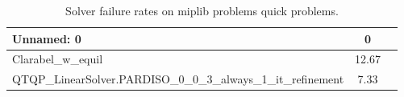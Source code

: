 \begin{table}
\caption{Solver failure rates on miplib problems quick problems.}
\label{t-miplib problems quick-failure}
\begin{tabular}{lcc}
\toprule
Unnamed: 0 & 0 \\
\midrule
Clarabel_w_equil & 12.67 \\
QTQP_LinearSolver.PARDISO_0_0_3_always_1_it_refinement & 7.33 \\
\bottomrule
\end{tabular}
\end{table}
